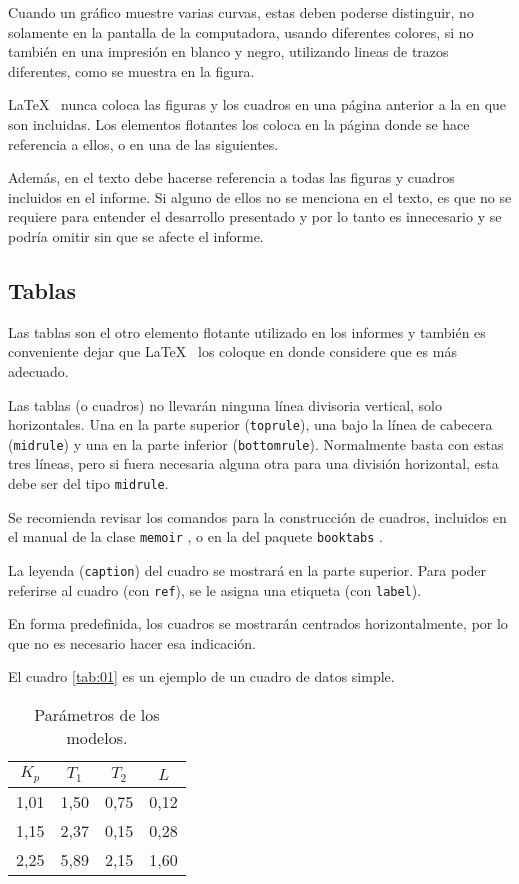 Cuando un gráfico muestre varias curvas, estas deben poderse distinguir, no solamente en la pantalla de la computadora, usando diferentes colores, si no también en una impresión en blanco y negro, utilizando lineas de trazos diferentes, como se muestra en la figura.

\LaTeX~ nunca coloca las figuras y los cuadros en una página anterior a la en que son incluidas.  Los elementos flotantes los coloca en la página donde se hace referencia a ellos, o en una de las siguientes.

Además, en el texto debe hacerse referencia a todas las figuras y cuadros incluidos en el informe.  Si alguno de ellos no se menciona en el texto, es que no se requiere para entender el desarrollo presentado y por lo tanto es innecesario y se podría omitir sin que se afecte el informe.

\subsection{Tablas}
Las tablas son el otro elemento flotante utilizado en los informes y también es conveniente dejar que \LaTeX~ los coloque en donde considere que es más adecuado.

Las tablas (o cuadros) no llevarán ninguna línea divisoria vertical, solo horizontales. Una en la parte superior (\texttt{toprule}), una bajo la línea de cabecera (\texttt{midrule}) y una en la parte inferior (\texttt{bottomrule}).  Normalmente basta con estas tres líneas, pero si fuera necesaria alguna otra para una división horizontal, esta debe ser del tipo \texttt{midrule}.

Se recomienda revisar los comandos para la construcción de cuadros, incluidos en el manual de la clase \texttt{memoir} \cite{memoir2011}, o en la del paquete \texttt{booktabs} \cite{fear2005}.

La leyenda (\texttt{caption}) del cuadro se mostrará en la parte superior.  Para poder referirse al cuadro (con \texttt{ref}), se le asigna una etiqueta (con \texttt{label}).

En forma predefinida, los cuadros se mostrarán centrados horizontalmente, por lo que no es necesario hacer esa indicación. 

El cuadro \ref{tab:01} es un ejemplo de un cuadro de datos simple.

\begin{table}
\caption{Parámetros de los modelos.} \label{tab:01o}
		\begin{tabular}{@{}*{4}{c}@{}}
    \toprule
    $K_p$ & $T_1$ & $T_2$ & $L$ \\
    \midrule
     1,01 & 1,50 & 0,75 & 0,12 \\
		 1,15 & 2,37 & 0,15 & 0,28 \\
		 2,25 & 5,89 & 2,15 & 1,60 \\
    \bottomrule
    \end{tabular}
\end{table}

